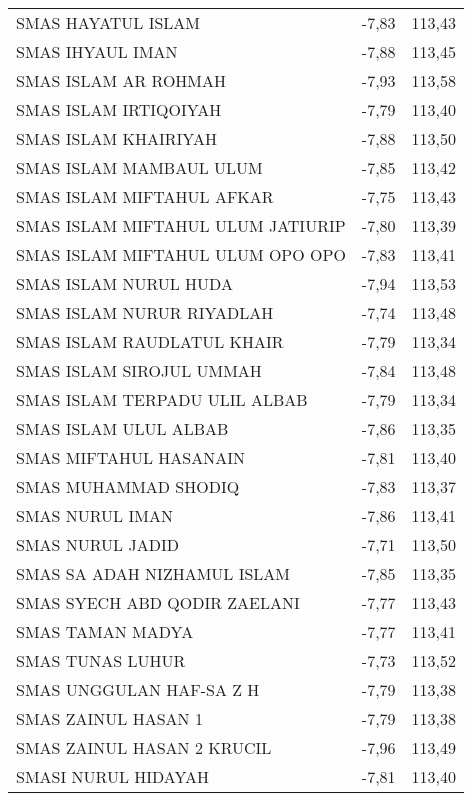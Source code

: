 {\begin{longtable}[c]{lcc}
\rowcolor[HTML]{D9E1F2} 
SMAS HAYATUL ISLAM                  & -7,83 & 113,43 \\
SMAS   IHYAUL IMAN                  & -7,88 & 113,45 \\
\rowcolor[HTML]{D9E1F2} 
SMAS ISLAM AR ROHMAH                & -7,93 & 113,58 \\
SMAS   ISLAM IRTIQOIYAH             & -7,79 & 113,40 \\
\rowcolor[HTML]{D9E1F2} 
SMAS ISLAM KHAIRIYAH                & -7,88 & 113,50 \\
SMAS   ISLAM MAMBAUL ULUM           & -7,85 & 113,42 \\
\rowcolor[HTML]{D9E1F2} 
SMAS ISLAM MIFTAHUL AFKAR           & -7,75 & 113,43 \\
SMAS   ISLAM MIFTAHUL ULUM JATIURIP & -7,80 & 113,39 \\
\rowcolor[HTML]{D9E1F2} 
SMAS ISLAM MIFTAHUL ULUM OPO OPO    & -7,83 & 113,41 \\
SMAS   ISLAM NURUL HUDA             & -7,94 & 113,53 \\
\rowcolor[HTML]{D9E1F2} 
SMAS ISLAM NURUR RIYADLAH           & -7,74 & 113,48 \\
SMAS   ISLAM RAUDLATUL KHAIR        & -7,79 & 113,34 \\
\rowcolor[HTML]{D9E1F2} 
SMAS ISLAM SIROJUL UMMAH            & -7,84 & 113,48 \\
SMAS   ISLAM TERPADU ULIL ALBAB     & -7,79 & 113,34 \\
\rowcolor[HTML]{D9E1F2} 
SMAS ISLAM ULUL ALBAB               & -7,86 & 113,35 \\
SMAS   MIFTAHUL HASANAIN            & -7,81 & 113,40 \\
\rowcolor[HTML]{D9E1F2} 
SMAS MUHAMMAD SHODIQ                & -7,83 & 113,37 \\
SMAS   NURUL IMAN                   & -7,86 & 113,41 \\
\rowcolor[HTML]{D9E1F2} 
SMAS NURUL JADID                    & -7,71 & 113,50 \\
SMAS   SA ADAH NIZHAMUL ISLAM       & -7,85 & 113,35 \\
\rowcolor[HTML]{D9E1F2} 
SMAS SYECH ABD QODIR ZAELANI        & -7,77 & 113,43 \\
SMAS   TAMAN MADYA                  & -7,77 & 113,41 \\
\rowcolor[HTML]{D9E1F2} 
SMAS TUNAS LUHUR                    & -7,73 & 113,52 \\
SMAS   UNGGULAN HAF-SA Z H          & -7,79 & 113,38 \\
\rowcolor[HTML]{D9E1F2} 
SMAS ZAINUL HASAN 1                 & -7,79 & 113,38 \\
SMAS   ZAINUL HASAN 2 KRUCIL        & -7,96 & 113,49 \\
\rowcolor[HTML]{D9E1F2} 
SMASI NURUL HIDAYAH                 & -7,81 & 113,40
\end{longtable}
}